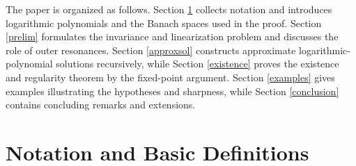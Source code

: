 \documentclass{amsart}
\theoremstyle{plain}
\theoremstyle{definition}
\begin{document}
The paper is organized as follows. Section \ref{notation} collects notation and introduces logarithmic polynomials and the Banach spaces used in the proof. Section \ref{prelim} formulates the invariance and linearization problem and discusses the role of outer resonances. Section \ref{approxsol} constructs approximate logarithmic-polynomial solutions recursively, while Section \ref{existence} proves the existence and regularity theorem by the fixed-point argument. Section \ref{examples} gives examples illustrating the hypotheses and sharpness, while Section \ref{conclusion} contains concluding remarks and extensions.



\section{Notation and Basic Definitions}\label{notation}
\end{document}
